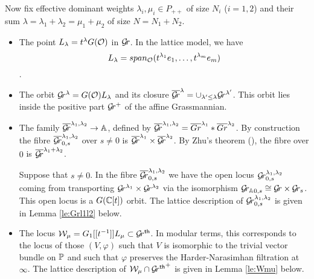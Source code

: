 \documentclass{article}
\begin{document}

Now fix effective dominant weights $ \lambda_i, \mu_i \in P_{++}$ of size $N_i$ ($i=1,2$) and their sum $ \lambda = \lambda_1 + \lambda_2 = \mu_1 + \mu_2$ of size $ N = N_1 + N_2$.

% 
\begin{itemize}
    \item The point $L_\lambda = t^\lambda G(\mathcal O)$ in $\mathcal{G}\!r$.  In the lattice model, we have
    $$ L_\lambda = span_\mathcal O(t^{\lambda_1}e_1, \dots, t^{\lambda_m}e_m) $$.
    \item The orbit $\mathcal{G}\!r^\lambda = G(\mathcal O) L_\lambda$ and its closure $ \overline{\mathcal{G}\!r}^\lambda = \cup_{\lambda' \le \lambda} \mathcal{G}\!r^{\lambda'}$.  This orbit lies inside the positive part $ \mathcal{G}\!r^+$ of the affine Grassmannian.
    \item The family $ \overline{\mathcal{G}\!r}^{\lambda_1, \lambda_2} \rightarrow \mathbb A$, defined by $ \overline{\mathcal{G}\!r}^{\lambda_1, \lambda_2} = \overline{Gr}^{\lambda_1} * \overline{Gr}^{\lambda_2}$.  By construction the fibre $ \overline{\mathcal{G}\!r}_{0,s}^{\lambda_1, \lambda_2} $ over $ s \ne 0 $ is $ \overline{\mathcal{G}\!r}^{\lambda_1} \times \overline{\mathcal{G}\!r}^{\lambda_2}$.  By Zhu's theorem (), the fibre over $ 0 $ is $ \overline{\mathcal{G}\!r}^{\lambda_1 + \lambda_2}$.
    
    Suppose that $ s \ne 0$.  In the fibre $\overline{\mathcal{G}\!r}_{0,s}^{\lambda_1, \lambda_2}$ we have the open locus $ \mathcal{G}\!r_{0,s}^{\lambda_1, \lambda_2}$ coming from transporting $ \mathcal{G}\!r^{\lambda_1} \times \mathcal{G}\!r^{\lambda_2} $ via the isomorphism $ {\mathcal{G}\!r_{\mathbb A}}_{0,s} \cong \mathcal{G}\!r \times \mathcal{G}\!r_s $.  This open locus is a $ G(\mathbb C[t])$ orbit.  The lattice description of $ \mathcal{G}\!r_{0,s}^{\lambda_1, \lambda_2}$ is given in Lemma \ref{le:Grl1l2} below.
    
    \item The locus $\mathcal W_\mu = G_1[[t^{-1}]]L_\mu \subset {\mathcal{G}\!r^{\sf th}} $.  In modular terms, this corresponds to the locus of those $ (V, \varphi)$ such that $ V $ is isomorphic to the trivial vector bundle on $ \mathbb P$ and such that $ \varphi$ preserves the Harder-Narasimhan filtration at $ \infty$.  The lattice description of $ \mathcal W_\mu \cap {\mathcal{G}\!r^{\sf th}}^+$ is given in Lemma \ref{le:Wmu} below.
    

\end{itemize}
\end{document}
